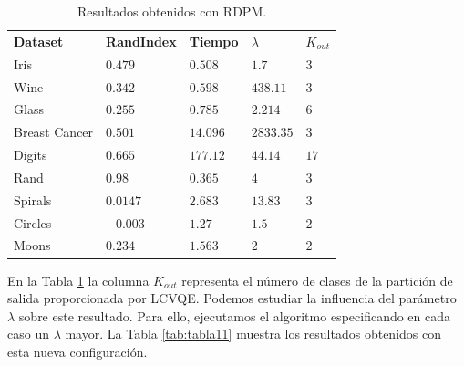 \begin{table}[!h]
	\centering
	\setlength{\arrayrulewidth}{1mm}
	\setlength{\tabcolsep}{10pt}
	\renewcommand{\arraystretch}{0.85}
	
	\begin{tabular}{ >{\centering\arraybackslash}m{2.5cm}  >{\centering\arraybackslash}m{1.8cm}>{\centering\arraybackslash}m{1.5cm}>{\centering\arraybackslash}m{1cm}>{\centering\arraybackslash}m{1cm}}
		\hline
		\rowcolor{black}
		\multicolumn{5}{c}{\bf \color{white}{Resultados obtenidos con RDPM}}\\
		\hline
		\rowcolor{gray!50}
		\textbf{Dataset} & \textbf{RandIndex} & \textbf{Tiempo} & \textbf{$\lambda$} & \textbf{$K_{out}$}  \\
		Iris & $0.479$ & $0.508$ & $1.7$ & $3$ \\
		Wine & $0.342$ & $0.598$ & $438.11$ & $3$ \\
		Glass & $0.255$ & $0.785$ & $2.214$ & $6$ \\
		Breast Cancer & $0.501$ & $14.096$ & $2833.35$ & $3$ \\
		Digits & $0.665$ & $177.12$ & $44.14$ & $17$ \\
		Rand & $0.98$ & $0.365$ & $4$ & $3$ \\
		Spirals & $0.0147$ & $2.683$ & $13.83$ & $3$ \\
		Circles & $-0.003$ & $1.27$ & $1.5$ & $2$  \\
		Moons & $0.234$ & $1.563$ & $2$ & $2$ \\
		\hline
		
	\end{tabular}
	\caption{Resultados obtenidos con \acs{RDPM}.}
	\label{tab:tabla10}
\end{table}

En la Tabla \ref{tab:tabla10} la columna $K_{out}$ representa el número de clases de la partición de salida proporcionada por \acs{LCVQE}. Podemos estudiar la influencia del parámetro $\lambda$ sobre este resultado. Para ello, ejecutamos el algoritmo especificando en cada caso un $\lambda$ mayor. La Tabla \ref{tab:tabla11} muestra los resultados obtenidos con esta nueva configuración.

